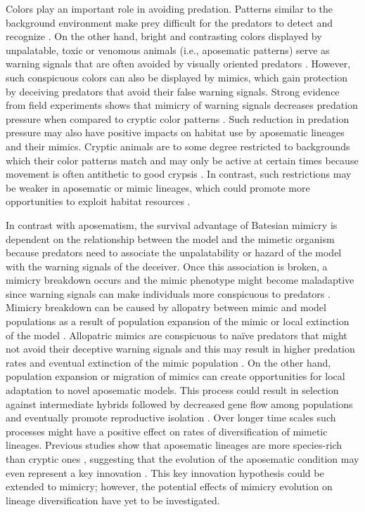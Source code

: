 Colors play an important role in avoiding predation. Patterns similar to the background environment make prey difficult for the predators to detect and recognize \citep{merilaita_2005, stevens_2009}. On the other hand, bright and contrasting colors displayed by unpalatable, toxic or venomous animals (i.e., aposematic patterns) serve as warning signals that are often avoided by visually oriented predators \citep{wallace_1867, mappes_2005, speed_2005}. However, such conspicuous colors can also be displayed by mimics, which gain protection by deceiving predators that avoid their false warning signals. Strong evidence from field experiments shows that mimicry of warning signals decreases predation pressure when compared to cryptic color patterns \citep{jeffords_batesian_1979, brodie_differential_1993, brodie_experimental_1995, pfennig_2001, pinheiro_2011, pfennig_2015}. Such reduction in predation pressure may also have positive impacts on habitat use by aposematic lineages and their mimics. Cryptic animals are to some degree restricted to backgrounds which their color patterns match and may only be active at certain times because movement is often antithetic to good crypsis \citep{speed_2010, stevens_2012}. In contrast, such restrictions may be weaker in aposematic or mimic lineages, which could promote more opportunities to exploit habitat resources \citep{speed_2010}.

In contrast with aposematism, the survival advantage of Batesian mimicry is dependent on the relationship between the model and the mimetic organism because predators need to associate the unpalatability or hazard of the model with the warning signals of the deceiver. Once this association is broken, a mimicry breakdown occurs and the mimic phenotype might become maladaptive since warning signals can make individuals more conspicuous to predators \citep{mallet_evolution_1999, pfennig_2001, pfennig_2015}. Mimicry breakdown can be caused by allopatry between mimic and model populations as a result of population expansion of the mimic or local extinction of the model \citep{pfennig_2010}. Allopatric mimics are conspicuous to naïve predators that might not avoid their deceptive warning signals and this may result in higher predation rates and eventual extinction of the mimic population \citep{pfennig_2015}. On the other hand, population expansion or migration of mimics can create opportunities for local adaptation to novel aposematic models. This process could result in selection against intermediate hybrids followed by decreased gene flow among populations and eventually promote reproductive isolation \citep{mallet_evolution_1999, pfennig_2015}. Over longer time scales such processes might have a positive effect on rates of diversification of mimetic lineages. Previous studies show that aposematic lineages are more species-rich than cryptic ones \citep{santos_2003, przeczek_2008}, suggesting that the evolution of the aposematic condition may even represent a key innovation \citep{speed_2010}. This key innovation hypothesis could be extended to mimicry; however, the potential effects of mimicry evolution on lineage diversification have yet to be investigated.

